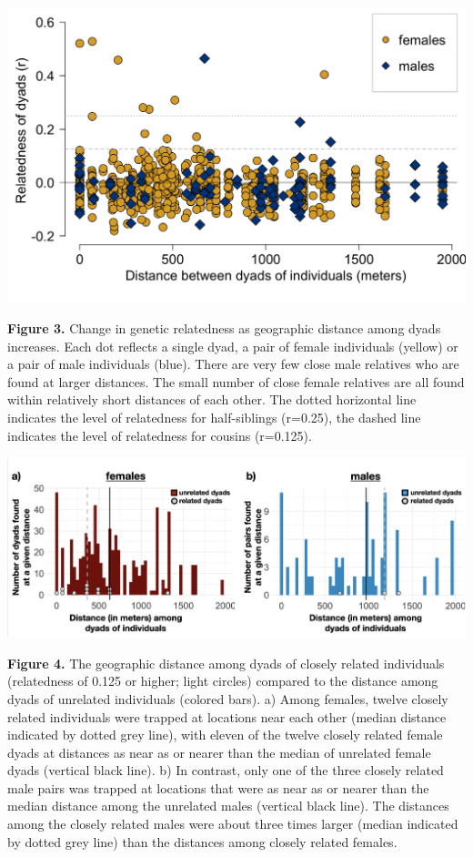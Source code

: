 \documentclass[]{article}
\begin{document}
\includegraphics{gdispersal_Figure2.png}

\textbf{Figure 3.} Change in genetic relatedness as geographic distance
among dyads increases. Each dot reflects a single dyad, a pair of female
individuals (yellow) or a pair of male individuals (blue). There are
very few close male relatives who are found at larger distances. The
small number of close female relatives are all found within relatively
short distances of each other. The dotted horizontal line indicates the
level of relatedness for half-siblings (r=0.25), the dashed line
indicates the level of relatedness for cousins (r=0.125).

\includegraphics{gdispersal_Figure3.png}

\textbf{Figure 4.} The geographic distance among dyads of closely
related individuals (relatedness of 0.125 or higher; light circles)
compared to the distance among dyads of unrelated individuals (colored
bars). a) Among females, twelve closely related individuals were trapped
at locations near each other (median distance indicated by dotted grey
line), with eleven of the twelve closely related female dyads at
distances as near as or nearer than the median of unrelated female dyads
(vertical black line). b) In contrast, only one of the three closely
related male pairs was trapped at locations that were as near as or
nearer than the median distance among the unrelated males (vertical
black line). The distances among the closely related males were about
three times larger (median indicated by dotted grey line) than the
distances among closely related females.
\end{document}
